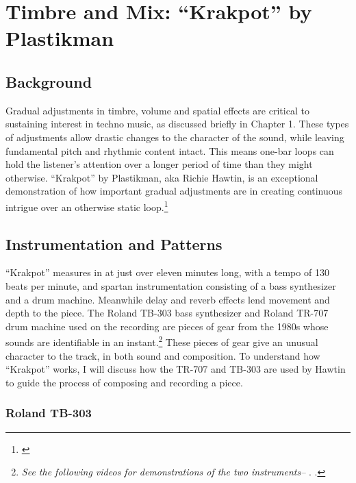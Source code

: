\documentclass[12pt,twoside]{reedthesis}
\begin{document}
\section{Timbre and Mix: ``Krakpot'' by Plastikman}
\label{sec:krakpot}

\subsection{Background}

Gradual adjustments in timbre, volume and spatial effects are critical to sustaining interest in techno music, as discussed briefly in Chapter 1. These types of adjustments allow drastic changes to the character of the sound, while leaving fundamental pitch and rhythmic content intact. This means one-bar loops can hold the listener's attention over a longer period of time than they might otherwise. ``Krakpot'' by Plastikman, aka Richie Hawtin, is an exceptional demonstration of how important gradual adjustments are in creating continuous intrigue over an otherwise static loop.\footnote{\cite{plastikmanKrakpot1993}}

\subsection{Instrumentation and Patterns}

``Krakpot'' measures in at just over eleven minutes long, with a tempo of 130 beats per minute, and spartan instrumentation consisting of a bass synthesizer and a drum machine. Meanwhile delay and reverb effects lend movement and depth to the piece. The Roland TB-303 bass synthesizer and Roland TR-707 drum machine used on the recording are pieces of gear from the 1980s whose sounds are identifiable in an instant.\footnote{\emph{See the following videos for demonstrations of the two instruments--} \cite{deathbydinsyncRolandTB303HQ2016}. \cite{zibbyboneRolandTR707Factory2017}.}  These pieces of gear give an unusual character to the track, in both sound and composition. To understand how ``Krakpot'' works, I will discuss how the TR-707 and TB-303 are used by Hawtin to guide the process of composing and recording a piece.

\subsubsection{Roland TB-303}
\end{document}
